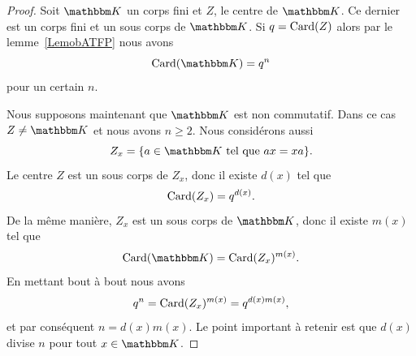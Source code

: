 \begin{proof}
    Soit \( \eK\) un corps fini et \( Z\), le centre de \( \eK\). Ce dernier est un corps fini et un sous corps de \( \eK\). Si \( q=\operatorname{Card}(Z)\) alors par le lemme~\ref{LemobATFP} nous avons
    \begin{equation}
        \Card(\eK)=q^n
    \end{equation}
    pour un certain \( n\).

    Nous supposons maintenant que \( \eK\) est non commutatif. Dans ce cas \( Z\neq \eK\) et nous avons \( n\geq 2\). Nous considérons aussi
    \begin{equation}
        Z_x=\{ a\in \eK\tq ax=xa \}.
    \end{equation}
    Le centre \( Z\) est un sous corps de \( Z_x\), donc il existe \( d(x)\) tel  que
    \begin{equation}
        \operatorname{Card}(Z_x)=q^{d(x)}.
    \end{equation}
    De la même manière, \( Z_x\) est un sous corps de \( \eK\), donc il existe \( m(x)\) tel que
    \begin{equation}
        \Card(\eK)=\Card(Z_x)^{m(x)}.
    \end{equation}
    En mettant bout à bout nous avons
    \begin{equation}
        q^n=\operatorname{Card}(Z_x)^{m(x)}=q^{d(x)m(x)},
    \end{equation}
    et par conséquent \( n=d(x)m(x)\). Le point important à retenir est que \( d(x)\) divise \( n\) pour tout \( x\in \eK\).


\end{proof}
